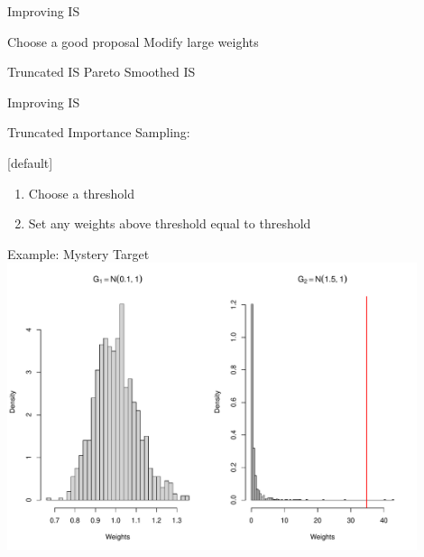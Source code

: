 \documentclass[14pt]{beamer}
\begin{document}


\begin{frame}{Improving IS}
    \begin{outline}
        \1 Choose a good proposal
        \1 Modify large weights \newline
        
        \1 Truncated IS
        \1 Pareto Smoothed IS
    \end{outline}
\end{frame}

\begin{frame}{Improving IS}
    \begin{outline}
        \1 Truncated Importance Sampling:
            \2 \citep{Ion08} \newline
    \end{outline}

    [default]
    \begin{enumerate}
        \item Choose a threshold
        \item Set any weights above threshold equal to threshold
    \end{enumerate}
\end{frame}

\begin{frame}{Example: Mystery Target}
    \centering
    \includegraphics[height=0.9\textheight, width=0.9\textwidth, keepaspectratio]{Figures/Wt Hist - Thresh.pdf}
\end{frame}
\end{document}
